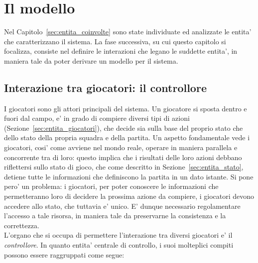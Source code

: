 
\section*{Il modello}
%
\label{sec:modello}

Nel Capitolo~\ref{sec:entita_coinvolte} sono state individuate ed analizzate le entita' che caratterizzano il sistema. La fase successiva, su cui questo capitolo si focalizza, consiste nel definire le interazioni che legano le suddette entita', in maniera tale da poter derivare un modello per il sistema.

\subsection*{Interazione tra giocatori: il controllore}
%
\label{sec:modello_interazione_giocatori}

I giocatori sono gli attori principali del sistema. Un giocatore si sposta dentro e fuori dal campo, e' in grado di compiere diversi tipi di azioni (Sezione~\ref{sec:entita_giocatori}), che decide sia sulla base del proprio stato che dello stato della propria squadra e della partita. Un aspetto fondamentale vede i giocatori, cosi' come avviene nel mondo reale, operare in maniera parallela e concorrente tra di loro: questo implica che i risultati delle loro azioni debbano riflettersi sullo stato di gioco, che come descritto in Sezione~\ref{sec:entita_stato}, detiene tutte le informazioni che definiscono la partita in un dato istante. Si pone pero' un problema: i giocatori, per poter conoscere le informazioni che permetteranno loro di decidere la prossima azione da compiere, i giocatori devono accedere allo stato, che tuttavia e' unico. E' dunque necessario regolamentare l'accesso a tale risorsa, in maniera tale da preservarne la consistenza e la correttezza.\\

L'organo che si occupa di permettere l'interazione tra diversi giocatori e' il \textit{controllore}. In quanto entita' centrale di controllo, i suoi molteplici compiti possono essere raggruppati come segue:

